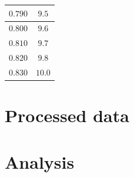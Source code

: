 \documentclass[letterpaper, 12pt]{article}
\begin{document}
\begin{longtable}{|c|c|}
    \hline
    $0.790$                                                                                                                                                                     & $9.5$                                                                                                                                                                                  \\
    \hline
    $0.800$                                                                                                                                                                     & $9.6$                                                                                                                                                                                  \\
    \hline
    $0.810$                                                                                                                                                                     & $9.7$                                                                                                                                                                                  \\
    \hline
    $0.820$                                                                                                                                                                     & $9.8$                                                                                                                                                                                  \\
    \hline
    $0.830$                                                                                                                                                                     & $10.0$                                                                                                                                                                                 \\
    \hline
\end{longtable}


\section{Processed data}




\section{Analysis}
\end{document}
